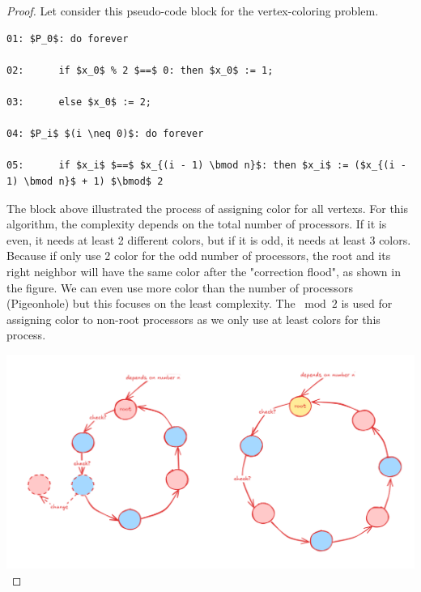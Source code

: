 \documentclass[12pt]{article}
\begin{document}
\bigskip

\begin{proof}



Let consider this pseudo-code block for the vertex-coloring problem.

\begin{lstlisting}    
01: $P_0$: do forever

02:      if $x_0$ % 2 $==$ 0: then $x_0$ := 1;

03:      else $x_0$ := 2;

04: $P_i$ $(i \neq 0)$: do forever

05:      if $x_i$ $==$ $x_{(i - 1) \bmod n}$: then $x_i$ := ($x_{(i - 1) \bmod n}$ + 1) $\bmod$ 2
\end{lstlisting}

The block above illustrated the process of assigning color for all vertexs. For this algorithm, the complexity
depends on the total number of processors. If it is even, it needs at least 2 different colors, but if it is odd, 
it needs at least 3 colors. Because if only use 2 color for the odd number of processors, the 
root and its right neighbor will have the same color after the "correction flood", as shown in the
figure. We can even use more color than the number of processors (Pigeonhole) but this focuses on the least complexity.
The $\bmod 2$ is used for assigning color to non-root processors as we only use at least colors for this process. 

\includegraphics[scale=0.35]{ring-color-self-stablize.png}


\end{proof}
\end{document}
